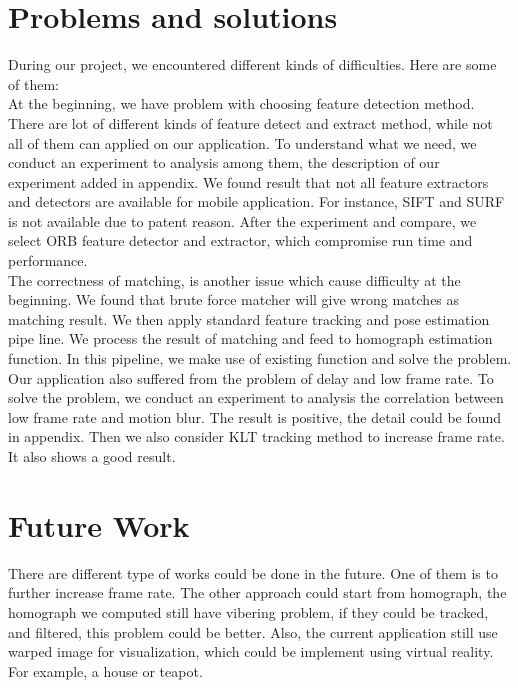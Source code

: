 \documentclass[10pt,conference,compsocconf]{IEEEtran}
\begin{document}
\section{Problems and solutions}
During our project, we encountered different kinds of difficulties. Here are some of them:\\
At the beginning, we have problem with choosing feature detection method. There are lot of different kinds of feature detect and extract method, while not all of them can applied on our application. To understand what we need, we conduct an experiment to analysis among them, the description of our experiment added in appendix. We found result that not all feature extractors and detectors are available for mobile application. For instance, SIFT and SURF is not available due to patent reason. After the experiment and compare, we select ORB feature detector and extractor, which compromise run time and performance.\\

The correctness of matching, is another issue which cause difficulty at the beginning. We found that brute force matcher will give wrong matches as matching result. We then apply standard feature tracking and pose estimation pipe line. We process the result of matching and feed to homograph estimation function. In this pipeline, we make use of existing function and solve the problem.\\

Our application also suffered from the problem of delay and low frame rate. To solve the problem, we conduct an experiment to analysis the correlation between low frame rate and motion blur. The result is positive, the detail could be found in appendix. Then we also consider KLT tracking method to increase frame rate. It also shows a good result.\\

\section{Future Work}
There are different type of works could be done in the future. One of them is to further increase frame rate. The other approach could start from homograph, the homograph we computed still have vibering problem, if they could be tracked, and filtered, this problem could be better. Also, the current application still use warped image for visualization, which could be implement using virtual reality. For example, a house or teapot.
\end{document}
